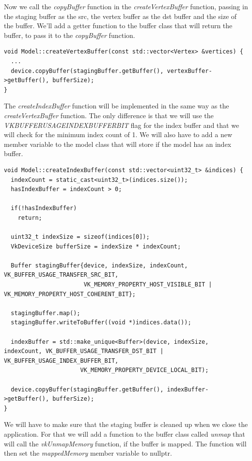 \documentclass[12pt]{report} \usepackage{preamble}
\begin{document}
Now we call the \textit{copyBuffer} function in the \textit{createVertexBuffer} function, passing in the staging buffer as the src, the vertex buffer as the dst buffer
and the size of the buffer. We'll add a getter function to the buffer class that will return the buffer, to pass it to the \textit{copyBuffer} function.

\begin{lstlisting}[Language=C++]
void Model::createVertexBuffer(const std::vector<Vertex> &vertices) {
  ...
  device.copyBuffer(stagingBuffer.getBuffer(), vertexBuffer->getBuffer(), bufferSize);
}
\end{lstlisting}

The \textit{createIndexBuffer} function will be implemented in the same way as the \textit{createVertexBuffer} function. The only difference is that we will use the \\
\textit{VK\textunderscore BUFFER\textunderscore USAGE\textunderscore INDEX\textunderscore BUFFER\textunderscore BIT} flag for the index buffer and that we will
check for the minimum index count of 1. We will also have to add a new member variable to the model class that will store if the model has an index buffer.

\begin{lstlisting}[Language=C++]
void Model::createIndexBuffer(const std::vector<uint32_t> &indices) {
  indexCount = static_cast<uint32_t>(indices.size());
  hasIndexBuffer = indexCount > 0;

  if(!hasIndexBuffer)
    return;

  uint32_t indexSize = sizeof(indices[0]);
  VkDeviceSize bufferSize = indexSize * indexCount;

  Buffer stagingBuffer{device, indexSize, indexCount, VK_BUFFER_USAGE_TRANSFER_SRC_BIT, 
                       VK_MEMORY_PROPERTY_HOST_VISIBLE_BIT | VK_MEMORY_PROPERTY_HOST_COHERENT_BIT};

  stagingBuffer.map();
  stagingBuffer.writeToBuffer((void *)indices.data());

  indexBuffer = std::make_unique<Buffer>(device, indexSize, indexCount, VK_BUFFER_USAGE_TRANSFER_DST_BIT | VK_BUFFER_USAGE_INDEX_BUFFER_BIT, 
                      VK_MEMORY_PROPERTY_DEVICE_LOCAL_BIT);

  device.copyBuffer(stagingBuffer.getBuffer(), indexBuffer->getBuffer(), bufferSize);
}
\end{lstlisting}

We will have to make sure that the staging buffer is cleaned up when we close the application.
For that we will add a function to the buffer class called \textit{unmap} that will call the \textit{vkUnmapMemory} function, if the buffer is mapped.
The function will then set the \textit{mappedMemory} member variable to nullptr.
\end{document}
